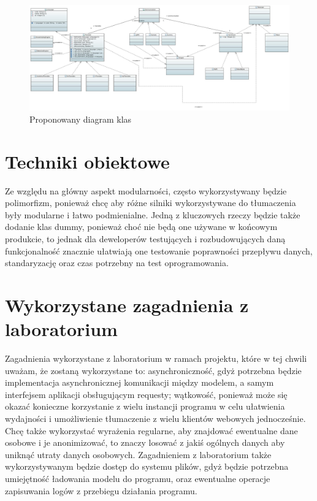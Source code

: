 \documentclass{article}
\begin{document}
\begin{figure}
\centering
  \includegraphics[width=1\linewidth]{Class_Diagram.JPG}
  \caption{\label{fig: class diagram}Proponowany diagram klas}
\end{figure}

\section{Techniki obiektowe}

Ze względu na główny aspekt modularności, często wykorzystywany będzie polimorfizm, ponieważ chcę aby różne silniki wykorzystywane do tłumaczenia były modularne i łatwo podmienialne. Jedną z kluczowych rzeczy będzie także dodanie klas dummy, ponieważ choć nie będą one używane w końcowym produkcie, to jednak dla deweloperów testujących i rozbudowujących daną funkcjonalność znacznie ułatwiają one testowanie poprawności przepływu danych, standaryzację oraz czas potrzebny na test oprogramowania. 


\section{Wykorzystane zagadnienia z laboratorium}

Zagadnienia wykorzystane z laboratorium w ramach projektu, które w tej chwili uważam, że zostaną wykorzystane to: asynchroniczność, gdyż potrzebna będzie implementacja asynchronicznej komunikacji między modelem, a samym interfejsem aplikacji obsługującym requesty; wątkowość, ponieważ może się okazać konieczne korzystanie z wielu instancji programu w celu ułatwienia wydajności i umożliwienie tłumaczenie z wielu klientów webowych jednocześnie. Chcę także wykorzystać wyrażenia regularne, aby znajdować ewentualne dane osobowe i je anonimizować, to znaczy losować z jakiś ogólnych danych aby uniknąć utraty danych osobowych. Zagadnieniem z laboratorium także wykorzystywanym będzie dostęp do systemu plików, gdyż będzie potrzebna umiejętność ładowania modelu do programu, oraz ewentualne operacje zapisuwania logów z przebiegu działania programu.
\end{document}
